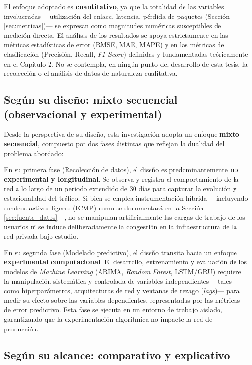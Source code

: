\documentclass[12pt]{report}
\begin{document}
El enfoque adoptado es \textbf{cuantitativo}, ya que la totalidad de las variables involucradas ---utilización del enlace, latencia, pérdida de paquetes (Sección \ref{sec:metricas})--- se expresan como magnitudes numéricas susceptibles de medición directa. El análisis de los resultados se apoya estrictamente en las métricas estadísticas de error (RMSE, MAE, MAPE) y en las métricas de clasificación (Precisión, Recall, \textit{F1-Score}) definidas y fundamentadas teóricamente 
en el Capítulo 2. No se contempla, en ningún punto del desarrollo de esta tesis, la recolección o el análisis de datos de naturaleza cualitativa.

\subsection*{Según su diseño: mixto secuencial (observacional y experimental)}

Desde la perspectiva de su diseño, esta investigación adopta un enfoque \textbf{mixto secuencial}, compuesto por dos fases distintas que reflejan la dualidad del problema abordado:

En su primera fase (Recolección de datos), el diseño es predominantemente \textbf{no experimental y longitudinal}. Se observa y registra el comportamiento de la red a lo largo de un periodo extendido de 30 días para capturar la evolución y estacionalidad del tráfico. Si bien se emplea instrumentación híbrida ---incluyendo sondeos activos ligeros (ICMP) como se documentará en la Sección \ref{sec:fuente_datos}---, no se manipulan artificialmente las cargas de trabajo de los usuarios 
ni se induce deliberadamente la congestión en la infraestructura de la red privada bajo estudio.

En su segunda fase (Modelado predictivo), el diseño transita hacia un enfoque \textbf{experimental computacional}. El desarrollo, entrenamiento y evaluación de los modelos de \textit{Machine Learning} (ARIMA, \textit{Random Forest}, LSTM/GRU) requiere la manipulación sistemática y controlada de variables independientes ---tales como hiperparámetros, arquitecturas de red y ventanas de rezago (\textit{lags})--- para medir su efecto sobre las variables dependientes, representadas por 
las métricas de error predictivo. Esta fase se ejecuta en un entorno de trabajo aislado, garantizando que la experimentación algorítmica no impacte la red de producción.

\subsection*{Según su alcance: comparativo y explicativo}
\end{document}
